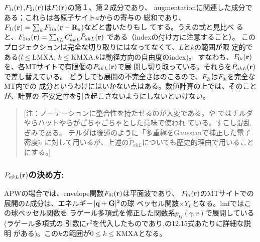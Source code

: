 \documentclass[a4paper,10pt,aip,onecolumn,amsmath,amssymb,floatfix,rmp]{revtex4-1}
\newcommand{\bfq}{{\bf q}}
\newcommand{\bfr}{{\bf r}}
\newcommand{\bfG}{{\bf G}}
\newcommand{\bfR}{{\bf R}}
\begin{document}
$F_{1i}(\bfr)$,$F_{2i}(\bfr)$は$F_i(\bfr)$の第１、第２成分であり、
augmentationに関連した成分である；これらは各原子サイト$a$からの寄与の
総和であり、$F_{1i}(\bfr)=\sum_a F_{1ia}(\bfr-\bfR_a)$などと書いたりもし
てする。うえの式と見比べ
ると、$F_{1ia}(\bfr)=\sum_{kL} C^{i}_{akL} \tilde{P}_{akL}(\bfr)$
である（indexの付け方に注意すること）。
このプロジェクションは完全な切り取りにはなってなくて、$L$と$k$の範囲が限
定的である($l\le$LMXA, $k\le$KMXA.$k$は動径方向の自由度のindex)。
すなわち、$F_{0i}(\bfr)$を、各MTサイトで有限個の${P}_{akL} (\bfr)$で展
開し切り取っている。それらを$\tilde{P}_{akL}(\bfr)$で差し替えている。
どうしても展開の不完全さはのこるので、$F_{2i}$は$F_{0i}$を完全なMT内での
成分というわけにはいかない点はある。数値計算の上では、そのことが、計算の
不安定性を引き起こさないようにしないといけない。


\begin{quote}
[注：ノーテーションに整合性を持たせるのが大変である。\cite{PAW}や
\cite{kresse99}ではチルダやらハットやらがごちゃごちゃとした意味で使われ
 ている。すこし混乱ぎみである。
チルダは後述のように「多重極をGaussianで補正した電子密度$\tilde{n}$
に対して用いるが、上述の$\tilde{P}_{akL}$についても歴史的理由で用いることにする。]
\end{quote}


\subsubsection{\bf ${P}_{akL}(\bfr)$の決め方:}
APWの場合\cite{soler89}では、envelope関数$F_{0i}(\bfr)$は平面波であり、
$F_{0i}(\bfr)$のMTサイトでの展開の$L$成分は、エネルギー$|\bfq+\bfG|^2$の球
ベッセル関数$\times Y_L$となる。lmfではこの球ベッセル関数を
ラゲール多項式を修正した関数系$p_{kl}(\gamma,r)$で展開している(ラゲール多項式の
引数に$r^2$を代入したものであり,\cite{Bott98}の12.15式あたりに詳細な説明
がある)。この$k$の範囲が$0\le k \le$KMXAとなる。
\end{document}
